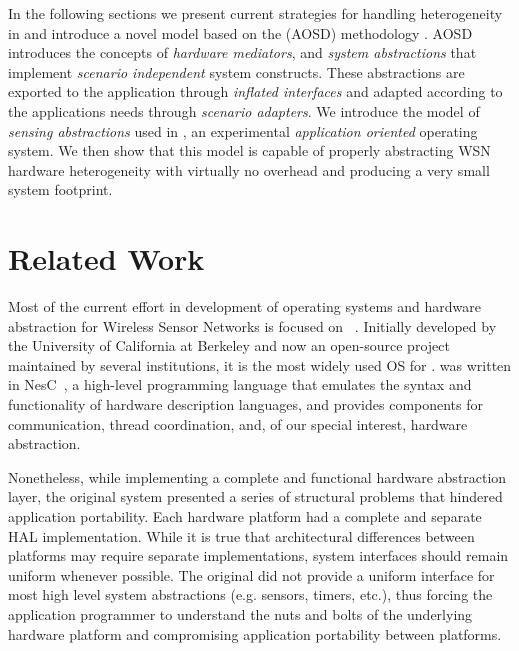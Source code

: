 In the following sections we present current strategies for handling
heterogeneity in \emph{\wsn{}} and introduce a novel model based on the
\emph{\aosd{}} (AOSD) methodology \cite{Froehlich:2001}.  AOSD
introduces the concepts of \emph{hardware mediators}, and \emph{system
  abstractions} that implement \emph{scenario independent} system
constructs.  These abstractions are exported to the application through
\emph{inflated interfaces} and adapted according to the applications
needs through \emph{scenario adapters}.  We introduce the model of
\emph{sensing abstractions} used in \epos{}, an experimental
\emph{application oriented} operating system.  We then show that this
model is capable of properly abstracting WSN hardware heterogeneity with
virtually no overhead and producing a very small system footprint.


\section{Related Work}

Most of the current effort in development of operating systems and
hardware abstraction for Wireless Sensor Networks is focused on
\emph{\tos{}}~\cite{Hill:2004}.
Initially developed by the University of California at Berkeley and now
an open-source project maintained by several institutions,
it is the most widely used OS for \wsn{}.
\tos{} was written in NesC~\cite{Gay:2003}, 
a high-level programming language that emulates the syntax and
functionality of hardware description languages, and
provides components for communication, thread coordination, and, of
our special interest, hardware abstraction.

Nonetheless, while implementing a complete and functional
{hardware abstraction layer}, the original \tos system presented a
series of structural problems that hindered application
portability. Each hardware platform had a complete and separate HAL
implementation. 
While it is true that architectural
differences between platforms may require separate implementations,
system interfaces should remain uniform whenever
possible. The original \tos{} did not provide a uniform interface for
most high level system abstractions (e.g. sensors, timers, etc.), thus
forcing the application programmer to understand the nuts and bolts of
the underlying hardware platform and compromising application
portability between platforms.

